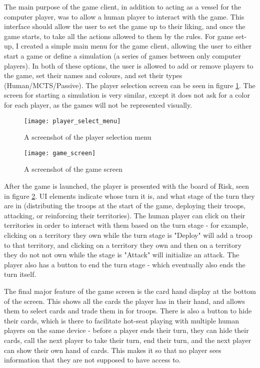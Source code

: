 The main purpose of the game client, in addition to acting as a vessel for the computer player, was to allow a human player to interact with the game. This interface should allow the user to set the game up to their liking, and once the game starts, to take all the actions allowed to them by the rules. For game set-up, I created a simple main menu for the game client, allowing the user to either start a game or define a simulation (a series of games between only computer players). In both of these options, the user is allowed to add or remove players to the game, set their names and colours, and set their types (Human/MCTS/Passive). The player selection screen can be seen in figure \ref{fig:PlayerSelectMenu}. The screen for starting a simulation is very similar, except it does not ask for a color for each player, as the games will not be represented visually.


\begin{figure}[H]
\texttt{[image: player\_select\_menu]}
\caption{A screenshot of the player selection menu}
\label{fig:PlayerSelectMenu}
\end{figure}

\begin{figure}[H]
\texttt{[image: game\_screen]}
\caption{A screenshot of the game screen}
\label{fig:GameScreen}
\end{figure}

After the game is launched, the player is presented with the board of Risk, seen in figure \ref{fig:GameScreen}. UI elements indicate whose turn it is, and what stage of the turn they are in (distributing the troops at the start of the game, deploying their troops, attacking, or reinforcing their territories). The human player can click on their territories in order to interact with them based on the turn stage - for example, clicking on a territory they own while the turn stage is "Deploy" will add a troop to that territory, and clicking on a territory they own and then on a territory they do not not own while the stage is "Attack" will initialize an attack. The player also has a button to end the turn stage - which eventually also ends the turn itself.

The final major feature of the game screen is the card hand display at the bottom of the screen. This shows all the cards the player has in their hand, and allows them to select cards and trade them in for troops. There is also a button to hide their cards, which is there to facilitate hot-seat playing with multiple human players on the same device - before a player ends their turn, they can hide their cards, call the next player to take their turn, end their turn, and the next player can show their own hand of cards. This makes it so that no player sees information that they are not supposed to have access to.

